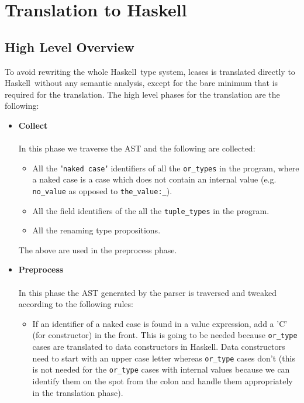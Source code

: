 \documentclass[diploma]{softlab-thesis}
\def\H{Haskell}
\begin{document}
\newpage
\chapter{Translation to \H}

\section{High Level Overview}

To avoid rewriting the whole \H\ type system, lcases is translated directly
to \H\ without any semantic analysis, except for the bare minimum that is
required for the translation. The high level phases for the translation are
the following:

\begin{itemize}
\item
\textbf{Collect}\\\\
In this phase we traverse the AST and the following are collected:

\begin{itemize}
\item
All the "\texttt{naked case}" identifiers of all the \verb|or_types| in the
program, where a naked case is a case which does not contain an internal value
(e.g. \verb|no_value| as opposed to \verb|the_value:_|).

\item
All the field identifiers of the all the \verb|tuple_types| in the program.

\item
All the renaming type propositions.

\end{itemize}

The above are used in the preprocess phase.

\item
\textbf{Preprocess}\\\\
In this phase the AST generated by the parser is traversed and tweaked
according to the following rules:

\begin{itemize}
\item
If an identifier of a naked case is found in a value expression, add a 'C' (for
constructor) in the front. This is going to be needed because \verb|or_type|
cases are translated to data constructors in \H. Data constructors need to
start with an upper case letter whereas \verb|or_type| cases don't
(this is not needed for the \verb|or_type| cases with internal values
because we can identify them on the spot from the colon and handle them
appropriately in the translation phase).\\


\end{itemize}
\end{itemize}
\end{document}
